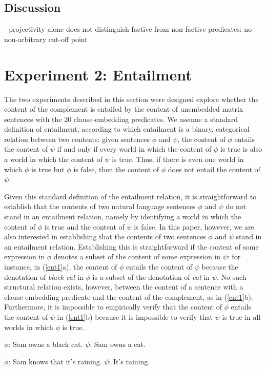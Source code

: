 \documentclass[11pt,fleqn]{article}
\newcommand{\6}{\mbox{$[\hspace*{-.6mm}[$}}
\newcommand{\9}{\mbox{$]\hspace*{-.6mm}]$}}
\begin{document}
\subsection{Discussion}

- projectivity alone does not distinguish factive from non-factive predicates: no non-arbitrary cut-off point
 
\section{Experiment 2: Entailment}\label{s3}

The two experiments described in this section were designed explore whether the content of the complement is entailed by the content of unembedded matrix sentences with the 20 clause-embedding predicates. We assume a standard definition of entailment, according to which entailment is a binary, categorical relation between two contents: given sentences $\phi$ and $\psi$, the content of $\phi$ entails the content of $\psi$ if and only if every world in which the content of $\phi$ is true is also a world in which the content of $\psi$ is true. Thus, if there is even one world in which $\phi$ is true but $\phi$ is false, then the content of $\phi$ does not entail the content of $\psi$. 

Given this standard definition of the entailment relation, it is straightforward to establish that the contents of two natural language sentences $\phi$ and $\psi$ do not stand in an entailment relation, namely by identifying a world in which the content of $\phi$ is true and the content of $\psi$ is false. In this paper, however, we are also interested in establishing that the contents of two sentences $\phi$ and $\psi$  stand in an entailment relation. Establishing this is straightforward if the content of some expression in $\phi$ denotes a subset of the content of some expression in $\psi$: for instance, in (\ref{ent1}a),  the content of $\phi$ entails the content of $\psi$ because the denotation of {\em black cat} in $\phi$ is a subset of the denotation of {\em cat} in $\psi$. No such structural relation exists, however, between the content of a sentence with a clause-embedding predicate and the content of the complement, as in (\ref{ent1}b). Furthermore, it is impossible to empirically verify that the content of $\phi$ entails the content of $\psi$ in (\ref{ent1}b) because it is impossible to verify that $\psi$ is true in all worlds in which $\phi$ is true. 

\begin{exe}
\ex\label{ent1}
\begin{xlist}
\ex $\phi$: Sam owns a black cat. \hspace*{1.5cm} $\psi$: Sam owns a cat.

\ex $\phi$: Sam knows that it's raining. \hspace*{.6cm} $\psi$: It's raining.

\end{xlist}
\end{exe}
\end{document}
